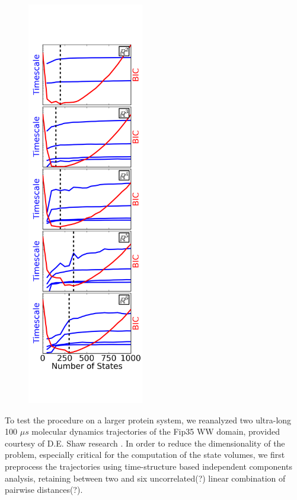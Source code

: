 \documentclass[twocolumn,floatfix,nofootinbib,aps]{revtex4-1}
\begin{document}
\begin{figure}
\centering
\includegraphics[width=2in]{figs/ww_bic_vs_eval_slide_nscounts.png}
\caption{}
\label{fig:ww}
\end{figure}

To test the procedure on a larger protein system, we reanalyzed two ultra-long 100 $\mu s$ molecular dynamics trajectories of the Fip35 WW domain\cite{Liu2008Experimental}, provided courtesy of D.E. Shaw research \cite{}. In order to reduce the dimensionality of the problem, especially critical for the computation of the state volumes, we first preprocess the trajectories using time-structure based independent components analysis, retaining between two and six uncorrelated(?) linear combination of pairwise distances(?).







\end{document}
